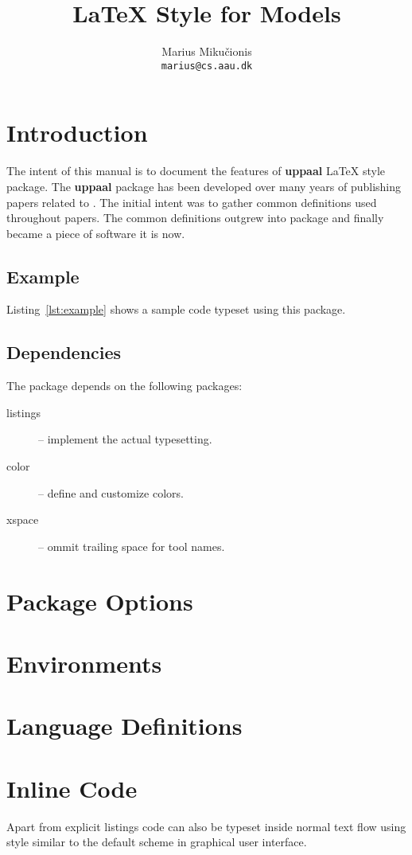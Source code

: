 \documentclass[a4paper,final]{article}
\title{\LaTeX{} Style for \uppaal Models}
\author{Marius Miku\v{c}ionis \\ {\tt marius@cs.aau.dk}}
\begin{document}
\maketitle


\section{Introduction}
The intent of this manual is to document the features of {\bf uppaal} \LaTeX{} style package.
The {\bf uppaal} package has been developed over many years of publishing papers related to \uppaal.
The initial intent was to gather common definitions used throughout papers.
The common definitions outgrew into package and finally became a piece of software it is now.

\subsection{Example}
Listing~\ref{lst:example} shows a sample \uppaal code typeset using this package.




\subsection{Dependencies}
The package depends on the following packages:
\begin{description}
\item[listings] -- implement the actual typesetting.
\item[color] -- define and customize colors.
\item[xspace] -- ommit trailing space for tool names.
\end{description}

\section{Package Options}


\section{Environments}

\section{Language Definitions}

\section{Inline Code}
Apart from explicit listings \uppaal code can also be typeset inside normal text flow using style similar to the default scheme in \uppaal graphical user interface.
\end{document}

